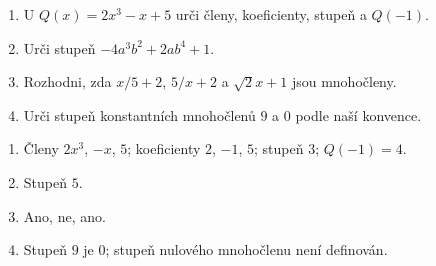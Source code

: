 \documentclass[11pt,a4paper]{article}
\begin{document}
\begin{zadaniReseniBox}[title={Domácí úkol},breakable=false]
\begin{enumerate}[label=\alph*)]
\item U $Q(x)=2x^3-x+5$ urči členy, koeficienty, stupeň a $Q(-1)$.
\item Urči stupeň $-4a^3b^2+2ab^4+1$.
\item Rozhodni, zda $x/5+2$, $5/x+2$ a $\sqrt2x+1$ jsou mnohočleny.
\item Urči stupeň konstantních mnohočlenů $9$ a $0$ podle naší konvence.
\end{enumerate}
\tcblower
\begin{enumerate}[label=\alph*)]
\item Členy $2x^3$, $-x$, $5$; koeficienty $2$, $-1$, $5$; stupeň $3$; $Q(-1)=4$.
\item Stupeň $5$.
\item Ano, ne, ano.
\item Stupeň $9$ je $0$; stupeň nulového mnohočlenu není definován.
\end{enumerate}
\end{zadaniReseniBox}
\end{document}
